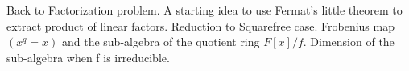 
\noindent

Back to Factorization problem. A starting idea to use Fermat's little theorem to extract product of linear factors. Reduction to Squarefree case.
Frobenius map $(x^q = x)$ and the sub-algebra of the quotient ring $F[x]/f$. Dimension of the sub-algebra when f is irreducible.
